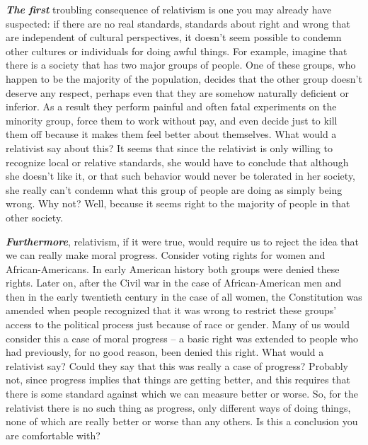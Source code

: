 \documentclass[
  12pt, openany]{book}
\theoremstyle{definition}
\theoremstyle{definition}
\theoremstyle{definition}
\theoremstyle{definition}
\theoremstyle{remark}
\begin{document}
\textbf{\emph{The first}} troubling consequence of relativism is one you may already have suspected: if there are no real standards, standards about right and wrong that are independent of cultural perspectives, it doesn't seem possible to condemn other cultures or individuals for doing awful things. For example, imagine that there is a society that has two major groups of people. One of these groups, who happen to be the majority of the population, decides that the other group doesn't deserve any respect, perhaps even that they are somehow naturally deficient or inferior. As a result they perform painful and often fatal experiments on the minority group, force them to work without pay, and even decide just to kill them off because it makes them feel better about themselves. What would a relativist say about this? It seems that since the relativist is only willing to recognize local or relative standards, she would have to conclude that although she doesn't like it, or that such behavior would never be tolerated in her society, she really can't condemn what this group of people are doing as simply being wrong. Why not? Well, because it seems right to the majority of people in that other society.

\textbf{\emph{Furthermore}}, relativism, if it were true, would require us to reject the idea that we can really make moral progress. Consider voting rights for women and African-Americans. In early American history both groups were denied these rights. Later on, after the Civil war in the case of African-American men and then in the early twentieth century in the case of all women, the Constitution was amended when people recognized that it was wrong to restrict these groups' access to the political process just because of race or gender. Many of us would consider this a case of moral progress -- a basic right was extended to people who had previously, for no good reason, been denied this right. What would a relativist say? Could they say that this was really a case of progress? Probably not, since progress implies that things are getting better, and this requires that there is some standard against which we can measure better or worse. So, for the relativist there is no such thing as progress, only different ways of doing things, none of which are really better or worse than any others. Is this a conclusion you are comfortable with?
\end{document}
